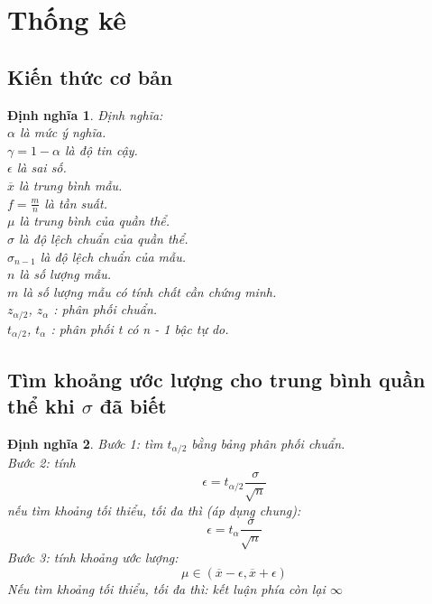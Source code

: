 \documentclass[12pt]{article}
\def\bar#1{\overline{#1}}
\newtheorem{thm}{Định nghĩa}
\begin{document}
\section {Thống kê}
\subsection{Kiến thức cơ bản}
\begin{thm}
    Định nghĩa: \\
    $\alpha$ là mức ý nghĩa. \\
    $\gamma = 1 - \alpha$ là độ tin cậy. \\
    $\epsilon$ là sai số. \\
    $\bar{x}$ là trung bình mẫu. \\
    $ f = \frac{m}{n}$ là tần suất. \\
    $\mu$ là trung bình của quần thể. \\
    $\sigma$ là độ lệch chuẩn của quần thể. \\
    $\sigma _{n - 1}$ là độ lệch chuẩn của mẫu. \\
    $n$ là số lượng mẫu. \\
    $m$ là số lượng mẫu có tính chất cần chứng minh. \\
    $z_{\alpha/2}$, $z_{\alpha}$ : phân phối chuẩn. \\
    $t_{\alpha/2}$, $t_{\alpha}$ : phân phối t có n - 1 bậc tự do. \\

\end{thm}
\subsection{Tìm khoảng ước lượng cho trung bình quần thể khi $\sigma$ đã biết}
\begin{thm}
    Bước 1: tìm $t_{\alpha/2}$ bằng bảng phân phối chuẩn. \\
    Bước 2: tính \begin{equation}
        \epsilon = t_{\alpha/2} \frac{\sigma}{\sqrt{n}}
    \end{equation}
    nếu tìm khoảng tối thiểu, tối đa thì (áp dụng chung): \begin{equation}
        \epsilon = t_{\alpha} \frac{\sigma}{\sqrt{n}}
    \end{equation}
    Bước 3: tính khoảng ước lượng: \begin{equation}
        \mu \in (\bar{x} - \epsilon, \bar{x} + \epsilon)
    \end{equation}
    Nếu tìm khoảng tối thiểu, tối đa thì: kết luận phía còn lại $\infty$

\end{thm}
\end{document}

